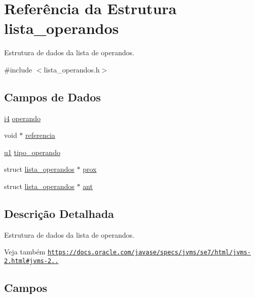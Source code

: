 \hypertarget{structlista__operandos}{}\section{Referência da Estrutura lista\+\_\+operandos}
\label{structlista__operandos}


Estrutura de dados da lista de operandos.  




{\ttfamily \#include $<$lista\+\_\+operandos.\+h$>$}

\subsection*{Campos de Dados}
\begin{DoxyCompactItemize}
\item 
\hyperlink{lista__operandos_8h_a7bc084923d20fddbe46335d882c6fda2}{i4} \hyperlink{structlista__operandos_ab978dbacb8f42fd87f19cca8e804d121}{operando}
\item 
void $\ast$ \hyperlink{structlista__operandos_a5efba56f9f00715a8c9558292b851d37}{referencia}
\item 
\hyperlink{lista__operandos_8h_ad9f4cdb6757615aae2fad89dab3c5470}{u1} \hyperlink{structlista__operandos_af64bc84846f21a809f68b783f0e39f40}{tipo\+\_\+operando}
\item 
struct \hyperlink{structlista__operandos}{lista\+\_\+operandos} $\ast$ \hyperlink{structlista__operandos_a90699e5c7f710177b37754cd5231c9f5}{prox}
\item 
struct \hyperlink{structlista__operandos}{lista\+\_\+operandos} $\ast$ \hyperlink{structlista__operandos_a23159c6dfeb873d67e8d51c312c551ee}{ant}
\end{DoxyCompactItemize}


\subsection{Descrição Detalhada}
Estrutura de dados da lista de operandos. 

\begin{DoxySeeAlso}{Veja também}
\href{https://docs.oracle.com/javase/specs/jvms/se7/html/jvms-2.html#jvms-2.6.2}{\tt https\+://docs.\+oracle.\+com/javase/specs/jvms/se7/html/jvms-\/2.\+html\#jvms-\/2..} 
\end{DoxySeeAlso}


\subsection{Campos}
\mbox{\label{structlista__operandos_a23159c6dfeb873d67e8d51c312c551ee}} 
